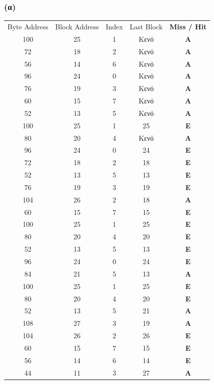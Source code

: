 \documentclass{article}
\begin{document}
\subsubsection*{\textbf{(α)}}

\begin{table}[h]
\centering
\small
\begin{tabular}{c|c|c|c|c}
\textlatin{Byte Address} & \textlatin{Block Address} & \textlatin{Index} & \textlatin{Last Block} & \textbf{\textlatin{Miss / Hit}} \\
100 & 25 & 1 & {Κενό} & \textbf{Α} \\
72 & 18 & 2 & {Κενό} & \textbf{Α} \\
56 & 14 & 6 & {Κενό} & \textbf{Α} \\
96 & 24 & 0 & {Κενό} & \textbf{Α} \\
76 & 19 & 3 & {Κενό} & \textbf{Α} \\
60 & 15 & 7 & {Κενό} & \textbf{Α} \\
52 & 13 & 5 & {Κενό} & \textbf{Α} \\
100 & 25 & 1 & 25 & \textbf{Ε} \\
80 & 20 & 4 & {Κενό} & \textbf{Α} \\
96 & 24 & 0 & 24 & \textbf{Ε} \\
72 & 18 & 2 & 18 & \textbf{Ε} \\
52 & 13 & 5 & 13 & \textbf{Ε} \\
76 & 19 & 3 & 19 & \textbf{Ε} \\
104 & 26 & 2 & 18 & \textbf{Α} \\
60 & 15 & 7 & 15 & \textbf{Ε} \\
100 & 25 & 1 & 25 & \textbf{Ε} \\
80 & 20 & 4 & 20 & \textbf{Ε} \\
52 & 13 & 5 & 13 & \textbf{Ε} \\
96 & 24 & 0 & 24 & \textbf{Ε} \\
84 & 21 & 5 & 13 & \textbf{Α} \\
100 & 25 & 1 & 25 & \textbf{Ε} \\
80 & 20 & 4 & 20 & \textbf{Ε} \\
52 & 13 & 5 & 21 & \textbf{Α} \\
108 & 27 & 3 & 19 & \textbf{Α} \\
104 & 26 & 2 & 26 & \textbf{Ε} \\
60 & 15 & 7 & 15 & \textbf{Ε} \\
56 & 14 & 6 & 14 & \textbf{Ε} \\
44 & 11 & 3 & 27 & \textbf{Α} \\

\end{tabular}
\end{table}
\end{document}
